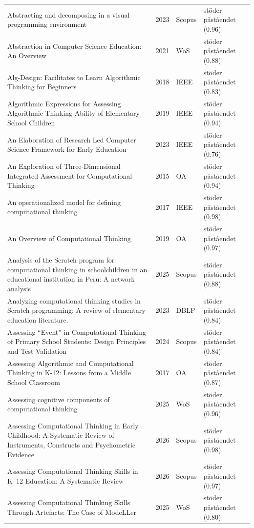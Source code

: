 \begin{longtable}{@{}%
  >{\raggedright\arraybackslash}p{}c%
  >{\raggedright\arraybackslash}p{}%
  >{\raggedright\arraybackslash}p{}@{}}
Abstracting and decomposing in a visual programming environment & 2023 & Scopus & stöder påståendet (0.96) \\
Abstraction in Computer Science Education: An Overview & 2021 & WoS & stöder påståendet (0.88) \\
Alg-Design: Facilitates to Learn Algorithmic Thinking for Beginners & 2018 & IEEE & stöder påståendet (0.83) \\
Algorithmic Expressions for Assessing Algorithmic Thinking Ability of Elementary School Children & 2019 & IEEE & stöder påståendet (0.94) \\
An Elaboration of Research Led Computer Science Framework for Early Education & 2023 & IEEE & stöder påståendet (0.76) \\
An Exploration of Three-Dimensional Integrated Assessment for Computational Thinking & 2015 & OA & stöder påståendet (0.94) \\
An operationalized model for defining computational thinking & 2017 & IEEE & stöder påståendet (0.98) \\
An Overview of Computational Thinking & 2019 & OA & stöder påståendet (0.97) \\
Analysis of the Scratch program for computational thinking in schoolchildren in an educational institution in Peru: A network analysis & 2025 & Scopus & stöder påståendet (0.88) \\
Analyzing computational thinking studies in Scratch programming: A review of elementary education literature. & 2023 & DBLP & stöder påståendet (0.84) \\
Assessing ``Event'' in Computational Thinking of Primary School Students: Design Principles and Test Validation & 2024 & Scopus & stöder påståendet (0.84) \\
Assessing Algorithmic and Computational Thinking in K-12: Lessons from a Middle School Classroom & 2017 & OA & stöder påståendet (0.87) \\
Assessing cognitive components of computational thinking & 2025 & WoS & stöder påståendet (0.96) \\
Assessing Computational Thinking in Early Childhood: A Systematic Review of Instruments, Constructs and Psychometric Evidence & 2026 & Scopus & stöder påståendet (0.98) \\
Assessing Computational Thinking Skills in K--12 Education: A Systematic Review & 2026 & Scopus & stöder påståendet (0.97) \\
Assessing Computational Thinking Skills Through Artefacts: The Case of ModeLLer & 2025 & WoS & stöder påståendet (0.80) \\

\end{longtable}
